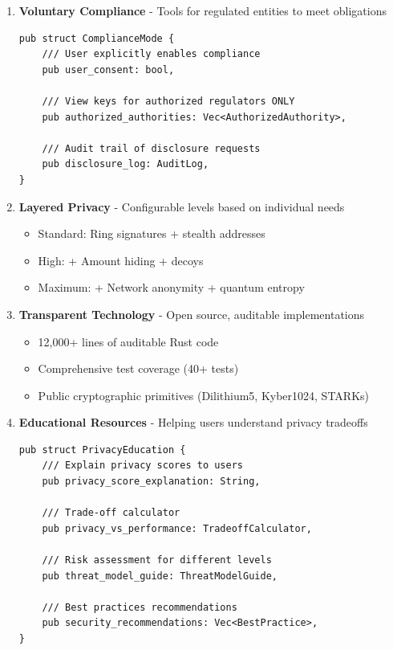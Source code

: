 \documentclass[12pt,a4paper]{article}
\begin{document}
\begin{enumerate}
\item \textbf{Voluntary Compliance} - Tools for regulated entities to meet obligations
\begin{lstlisting}[style=rustcode, caption=Opt-In Compliance]
pub struct ComplianceMode {
    /// User explicitly enables compliance
    pub user_consent: bool,

    /// View keys for authorized regulators ONLY
    pub authorized_authorities: Vec<AuthorizedAuthority>,

    /// Audit trail of disclosure requests
    pub disclosure_log: AuditLog,
}
\end{lstlisting}

\item \textbf{Layered Privacy} - Configurable levels based on individual needs
\begin{itemize}
\item Standard: Ring signatures + stealth addresses
\item High: + Amount hiding + decoys
\item Maximum: + Network anonymity + quantum entropy
\end{itemize}

\item \textbf{Transparent Technology} - Open source, auditable implementations
\begin{itemize}
\item 12,000+ lines of auditable Rust code
\item Comprehensive test coverage (40+ tests)
\item Public cryptographic primitives (Dilithium5, Kyber1024, STARKs)
\end{itemize}

\item \textbf{Educational Resources} - Helping users understand privacy tradeoffs

\begin{lstlisting}[style=rustcode, caption=Privacy Education System]
pub struct PrivacyEducation {
    /// Explain privacy scores to users
    pub privacy_score_explanation: String,

    /// Trade-off calculator
    pub privacy_vs_performance: TradeoffCalculator,

    /// Risk assessment for different levels
    pub threat_model_guide: ThreatModelGuide,

    /// Best practices recommendations
    pub security_recommendations: Vec<BestPractice>,
}
\end{lstlisting}
\end{enumerate}
\end{document}
